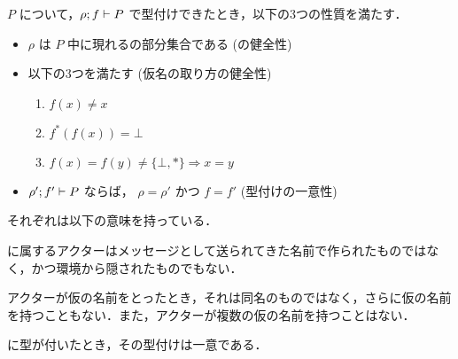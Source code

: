 \begin{thm}
  \conf $P$ について，$\rho ; f \vdash P$ で型付けできたとき，{\rm 以下の3つの性質を満たす．}

  \begin{itemize}
  \item
    $\rho$ は $P$ 中に現れる\free の部分集合である {\rm (\recep の健全性)}
  \item
   {\rm  以下の3つを満たす (仮名の取り方の健全性)}
    \begin{enumerate}
      \item $ f(x) \neq x $
      \item $ f^{*}(f(x)) = \bot $
      \item $ f(x) = f(y) \neq \{\bot, \ast\} \Rightarrow x = y $
    \end{enumerate}
  \item
    $\rho' ; f' \vdash P$ ならば， $\rho = \rho'$ かつ $f = f'$ {\rm (型付けの一意性)}
  \end{itemize}
\end{thm}

それぞれは以下の意味を持っている．

\begin{description}[style=nextline]
  \item[\recep の健全性]
    \recep に属するアクターはメッセージとして送られてきた名前で作られたものではなく，かつ環境から隠されたものでもない．
  \item[仮名の取り方の健全性]
    アクターが仮の名前をとったとき，それは同名のものではなく，さらに仮の名前を持つこともない．また，アクターが複数の仮の名前を持つことはない．
  \item[型付けの一意性]
    \conf に型が付いたとき，その型付けは一意である．
\end{description}








